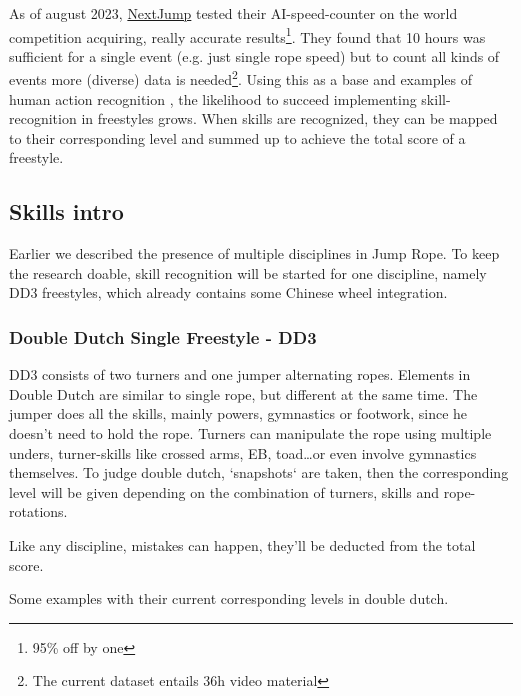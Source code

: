 As of august 2023, \href{https://nextjump.app/}{NextJump} tested their AI-speed-counter on the world competition acquiring, really accurate results\footnote{95\% off by one}. They found that 10 hours was sufficient for a single event (e.g. just single rope speed) but to count all kinds of events more (diverse) data is needed\footnote{The current dataset entails 36h video material}. Using this as a base and examples of human action recognition \autocite{Yin_2024}, the likelihood to succeed implementing skill-recognition in freestyles grows.
When skills are recognized, they can be mapped to their corresponding level and summed up to achieve the total score of a freestyle.

\subsection{Skills intro}
\label{subsec:basisskills}

Earlier we described the presence of multiple disciplines in Jump Rope. To keep the research doable, skill recognition will be started for one discipline, namely DD3 freestyles, which already contains some Chinese wheel integration.

\subsubsection{Double Dutch Single Freestyle - DD3}
\label{subsubsec:dd3}

DD3 consists of two turners and one jumper alternating ropes. Elements in Double Dutch are similar to single rope, but different at the same time. The jumper does all the skills, mainly powers, gymnastics or footwork, since he doesn't need to hold the rope. Turners can manipulate the rope using multiple unders, turner-skills like crossed arms, EB, toad\dots or even involve gymnastics themselves.
To judge double dutch, `snapshots` are taken, then the corresponding level will be given depending on the combination of turners, skills and rope-rotations.

Like any discipline, mistakes can happen, they'll be deducted from the total score.

Some examples with their current corresponding levels in double dutch.

